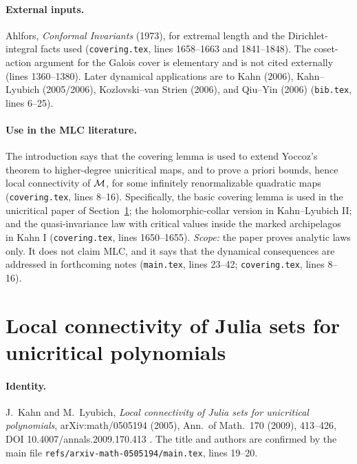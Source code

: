 \paragraph{External inputs.}
Ahlfors, \emph{Conformal Invariants} (1973), for extremal length and the Dirichlet-integral facts used
(\texttt{covering.tex}, lines 1658--1663 and 1841--1848).  The coset-action argument for the Galois cover is
elementary and is not cited externally (lines 1360--1380).  Later dynamical applications are to Kahn (2006),
Kahn--Lyubich (2005/2006), Kozlovski--van Strien (2006), and Qiu--Yin (2006) (\texttt{bib.tex}, lines 6--25).

\paragraph{Use in the MLC literature.}
The introduction says that the covering lemma is used to extend Yoccoz's theorem to higher-degree unicritical
maps, and to prove a priori bounds, hence local connectivity of $\mathcal M$, for some infinitely renormalizable quadratic
maps (\texttt{covering.tex}, lines 8--16).  Specifically, the basic covering lemma is used in the unicritical paper of
Section~\ref{sec:kl-unicritical}; the holomorphic-collar version in Kahn--Lyubich II; and the quasi-invariance law
with critical values inside the marked archipelagos in Kahn I (\texttt{covering.tex}, lines 1650--1655).
\emph{Scope:} the paper proves analytic laws only.  It does not claim MLC, and it says that the dynamical
consequences are addressed in forthcoming notes (\texttt{main.tex}, lines 23--42; \texttt{covering.tex},
lines 8--16).

\section{Local connectivity of Julia sets for unicritical polynomials}
\label{sec:kl-unicritical}

\paragraph{Identity.}
J.~Kahn and M.~Lyubich, \emph{Local connectivity of Julia sets for unicritical polynomials},
arXiv:math/0505194 (2005), Ann.\ of Math.\ 170 (2009), 413--426, DOI 10.4007/annals.2009.170.413
\cite{KahnLyubichUnicritical}.  The title and authors are confirmed by the main file
\texttt{refs/arxiv-math-0505194/main.tex}, lines 19--20.

